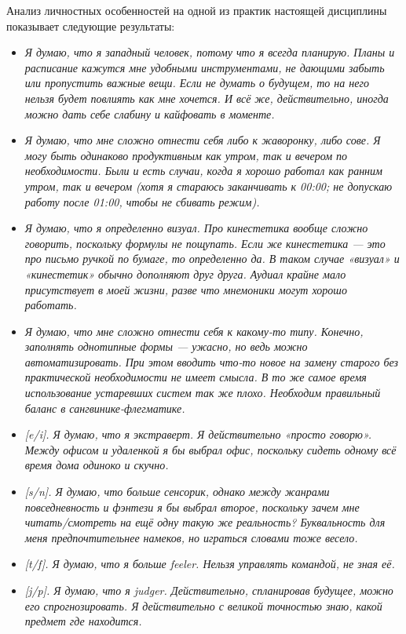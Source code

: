 Анализ личностных особенностей на одной из практик настоящей дисциплины показывает следующие результаты:
\begin{itemize}
    \item \textit{Я думаю, что я западный человек, потому что я всегда планирую. Планы и расписание кажутся мне удобными инструментами, не дающими забыть или пропустить важные вещи. Если не думать о будущем, то на него нельзя будет повлиять как мне хочется. И всё же, действительно, иногда можно дать себе слабину и кайфовать в моменте.}
    \item \textit{Я думаю, что мне сложно отнести себя либо к жаворонку, либо сове. Я могу быть одинаково продуктивным как утром, так и вечером по необходимости. Были и есть случаи, когда я хорошо работал как ранним утром, так и вечером (хотя я стараюсь заканчивать к 00:00; не допускаю работу после 01:00, чтобы не сбивать режим).}
    \item \textit{Я думаю, что я определенно визуал. Про кинестетика вообще сложно говорить, поскольку формулы не пощупать. Если же кинестетика — это про письмо ручкой по бумаге, то определенно да. В таком случае «визуал» и «кинестетик» обычно дополняют друг друга. Аудиал крайне мало присутствует в моей жизни, разве что мнемоники могут хорошо работать.}
    \item \textit{Я думаю, что мне сложно отнести себя к какому-то типу. Конечно, заполнять однотипные формы — ужасно, но ведь можно автоматизировать. При этом вводить что-то новое на замену старого без практической необходимости не имеет смысла. В то же самое время использование устаревших систем так же плохо. Необходим правильный баланс в сангвинике-флегматике.}
    \item \textit{[e/i]. Я думаю, что я экстраверт. Я действительно «просто говорю». Между офисом и удаленкой я бы выбрал офис, поскольку сидеть одному всё время дома одиноко и скучно.}
    \item \textit{[s/n]. Я думаю, что больше сенсорик, однако между жанрами повседневность и фэнтези я бы выбрал второе, поскольку зачем мне читать/смотреть на ещё одну такую же реальность? Буквальность для меня предпочтительнее намеков, но играться словами тоже весело.}
    \item \textit{[t/f]. Я думаю, что я больше feeler. Нельзя управлять командой, не зная её.}
    \item \textit{[j/p]. Я думаю, что я judger. Действительно, спланировав будущее, можно его спрогнозировать. Я действительно с великой точностью знаю, какой предмет где находится.}
\end{itemize}

